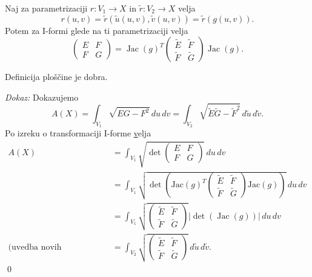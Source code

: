 \begin{izrek}
\label{izr_transformacija_1_forme}
  Naj za parametrizaciji $r: V_1 \to  X$ in $\tilde{r}: V_2 \to X$ velja 
  \begin{equation*} r(u,v) = \tilde{r}(\tilde{u}(u,v), \tilde{v}(u,v)) = \tilde{r}(g(u,v)).\end{equation*}Potem za I-formi glede na ti parametrizaciji velja 
  \begin{equation*} \begin{pmatrix}
  E & F \\
  F & G
  \end{pmatrix} = \operatorname{Jac}(g)^{T}
  \begin{pmatrix}
    \tilde{E} & \tilde{F} \\
    \tilde{F} & \tilde{G}
    \end{pmatrix}
  \operatorname{Jac}(g). \end{equation*}
\end{izrek}

\begin{posledica}
\label{psl_dobra_definiranost_ploscine}
 Definicija ploščine \href{def_ploscina_plosvke} je dobra.
\end{posledica}
\noident
{\em Dokaz:\/}
 Dokazujemo 
 \begin{equation*} A(X) = \int_{V_1} \sqrt{EG - F^2}   \, du \, dv = \int_{V_2}  \sqrt{\tilde{E}\tilde{G} -  \tilde{F}^2}  \, d \tilde{u} \, d \tilde{v}.\end{equation*}
 Po izreku o transformaciji I-forme \href{izr_transformacija_1_forme} velja 
 \begin{align*}
     A(X) &= \int_{V_1} \sqrt{\det \begin{pmatrix}
     E & F \\
     F & G
     \end{pmatrix}}   \, du \, dv \\
      &= \int_{V_1}  \sqrt{\det \left( \text{Jac}(g)^{T}
      \begin{pmatrix}
        \tilde{E} & \tilde{F} \\
        \tilde{F} & \tilde{G}
        \end{pmatrix}
      \text{Jac}(g) \right) }   \, du \, dv \\ 
      &= \int_{V_1} \sqrt{\begin{pmatrix}
        \tilde{E} & \tilde{F} \\
        \tilde{F} & \tilde{G}
      \end{pmatrix}} \left| \det \left( \operatorname{Jac}(g) \right) \right|  \, du \, dv \\ 
     \text{(uvedba novih spremenljivk)} &= \int_{V_2} \sqrt{\begin{pmatrix}
      \tilde{E} & \tilde{F} \\
      \tilde{F} & \tilde{G}
      \end{pmatrix}}   \, d \tilde{u} \, d \tilde{v}.  
 \end{align*}
\qed

